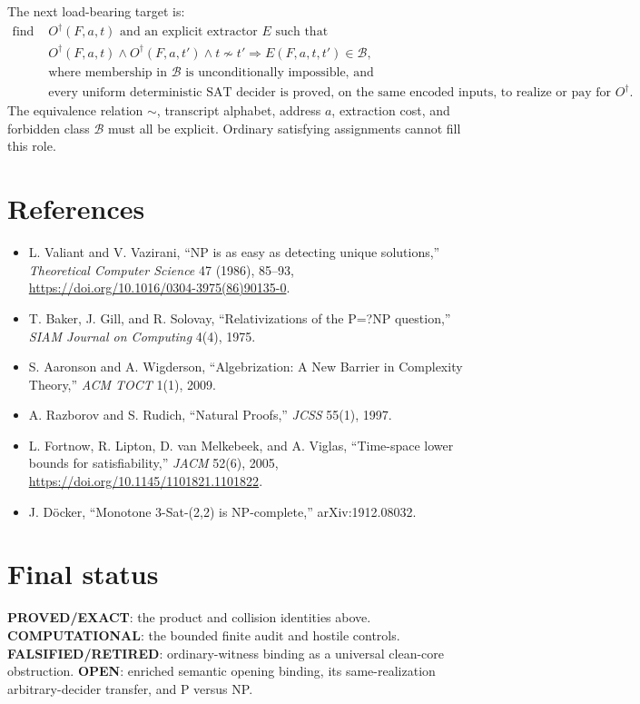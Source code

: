 \documentclass[11pt]{article}
\newcommand{\status}[1]{\textbf{#1}}
\begin{document}
The next load-bearing target is:
\[
\begin{split}
\text{find }&O^\dagger(F,a,t)\text{ and an explicit extractor }E\text{ such that}\\
&O^\dagger(F,a,t)\wedge O^\dagger(F,a,t')\wedge t\not\sim t'
  \Longrightarrow E(F,a,t,t')\in\mathcal{B},\\
&\text{where membership in }\mathcal{B}\text{ is unconditionally impossible, and}\\
&\text{every uniform deterministic SAT decider is proved, on the same encoded}
  \text{ inputs, to realize or pay for }O^\dagger.
\end{split}
\]
The equivalence relation $\sim$, transcript alphabet, address $a$, extraction
cost, and forbidden class $\mathcal B$ must all be explicit.  Ordinary
satisfying assignments cannot fill this role.

\section*{References}

\begin{itemize}
\item L. Valiant and V. Vazirani, ``NP is as easy as detecting unique
solutions,'' \emph{Theoretical Computer Science} 47 (1986), 85--93,
\url{https://doi.org/10.1016/0304-3975(86)90135-0}.
\item T. Baker, J. Gill, and R. Solovay, ``Relativizations of the P=?NP
question,'' \emph{SIAM Journal on Computing} 4(4), 1975.
\item S. Aaronson and A. Wigderson, ``Algebrization: A New Barrier in
Complexity Theory,'' \emph{ACM TOCT} 1(1), 2009.
\item A. Razborov and S. Rudich, ``Natural Proofs,'' \emph{JCSS} 55(1), 1997.
\item L. Fortnow, R. Lipton, D. van Melkebeek, and A. Viglas,
``Time-space lower bounds for satisfiability,'' \emph{JACM} 52(6), 2005,
\url{https://doi.org/10.1145/1101821.1101822}.
\item J. D\"ocker, ``Monotone 3-Sat-(2,2) is NP-complete,'' arXiv:1912.08032.
\end{itemize}

\section*{Final status}

\status{PROVED/EXACT}: the product and collision identities above.
\status{COMPUTATIONAL}: the bounded finite audit and hostile controls.
\status{FALSIFIED/RETIRED}: ordinary-witness binding as a universal clean-core
obstruction.  \status{OPEN}: enriched semantic opening binding, its
same-realization arbitrary-decider transfer, and P versus NP.

\end{document}
